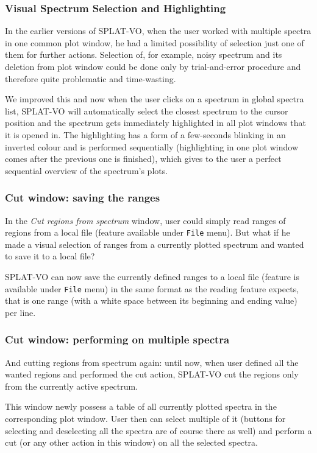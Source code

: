 \documentclass[final,authoryear,5p,times,twocolumn]{elsarticle}
\begin{document}
\subsubsection{Visual Spectrum Selection and Highlighting}

In the earlier versions of SPLAT-VO, when the user worked with multiple
spectra in one common plot window, he  had a limited possibility of
selection just one of them for further actions. Selection of, for example, noisy
spectrum and its deletion from plot window could be done only by
trial-and-error procedure and therefore quite problematic and time-wasting.

We improved this and now when the user clicks on a spectrum in global spectra
list, SPLAT-VO will automatically select the closest spectrum to the cursor
position and  the spectrum gets immediately highlighted in all plot windows
that it is opened in. The highlighting has a form of a few-seconds blinking in
an inverted colour and is performed sequentially (highlighting in one plot
window comes after the previous one is finished), which gives to the user a
perfect sequential overview of the spectrum's plots.

\subsubsection{Cut window: saving the ranges}

In the \emph{Cut regions from spectrum} window, user could simply read
ranges of regions from a local file (feature available under \texttt{File}
menu). But what if he made a visual selection of ranges from a
currently plotted spectrum and wanted to save it to a local file?

SPLAT-VO can now save the currently defined
ranges to a local file (feature is available under \texttt{File} menu) in the
same format as the reading feature expects, that is one range (with a
white space between its beginning and ending value) per line.

\subsubsection{Cut window: performing on multiple spectra}

And cutting regions from spectrum again: until now, when user defined
all the wanted regions and performed the cut action, SPLAT-VO cut the
regions only from the currently active spectrum.

This window newly possess a table of all
currently plotted spectra in the corresponding plot window. User then
can select multiple of it (buttons for selecting and deselecting all
the spectra are of course there as well) and perform a cut (or any
other action in this window) on all the selected spectra.
\end{document}

